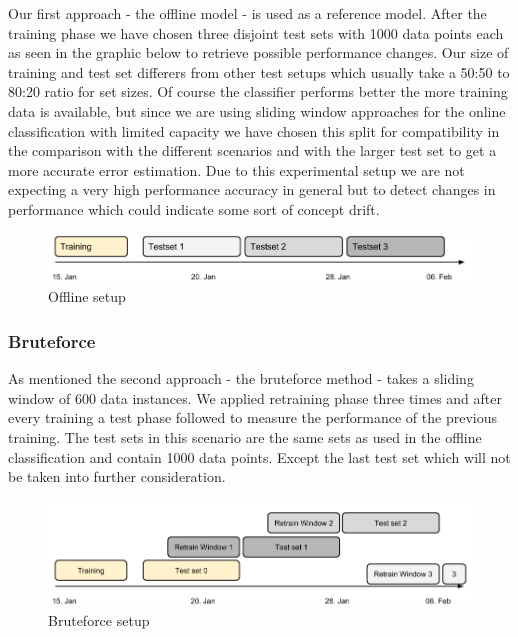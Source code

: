 \documentclass{article} %
\begin{document}
Our first approach - the offline model - is used as a reference model. After the training phase we have chosen three disjoint test sets with 1000 data points each as seen in the graphic below to retrieve possible performance changes.  Our size of training and test set differers from other test setups which usually take a 50:50 to 80:20 ratio for set sizes.  Of course the classifier performs better the more training data is available, but since we are using sliding window approaches for the online classification with limited capacity we  have chosen this split for compatibility in the comparison with the different scenarios and  with the larger test set to get a more accurate error estimation.  Due to this experimental setup we are not expecting a very high performance accuracy in general but to detect changes in performance which could indicate some sort of concept drift.
\begin{figure}[htbp]
  \centering
  \includegraphics[scale=0.28]{./time_models/OfflineModel.png}
  \caption{Offline setup}
\end{figure}
\subsubsection*{Bruteforce}
As mentioned the second approach - the bruteforce method -  takes a sliding window of 600 data instances. We applied retraining phase three times and after every training a test phase followed to measure the performance of the previous training.  The test sets in this scenario are the same sets as used in the offline classification and contain 1000 data points. Except the last test set which will not be taken into further consideration.
\begin{figure}[htbp]
  \centering
  \includegraphics[scale=0.28]{./time_models/BruteforceModel.png}
  \caption{Bruteforce setup}
\end{figure}
\end{document}
